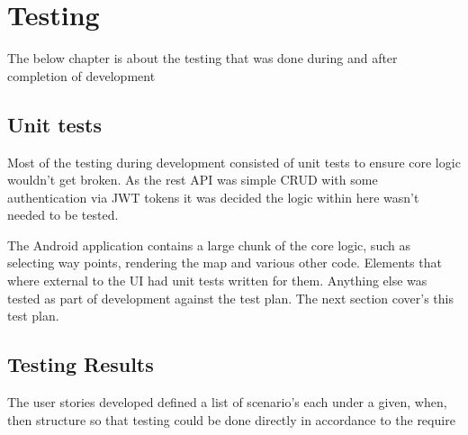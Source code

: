 \section{Testing}
The below chapter is about the testing that was done during and after completion of development

\subsection{Unit tests}
Most of the testing during development consisted of unit tests to ensure core logic wouldn't get broken. As the rest API was simple CRUD with some authentication via JWT tokens it was decided the logic within here wasn't needed to be tested. 

The Android application contains a large chunk of the core logic, such as selecting way points, rendering the map and various other code. Elements that where external to the UI had unit tests written for them. Anything else was tested as part of development against the test plan. The next section cover's this test plan.

\subsection{Testing Results}
The user stories developed defined a list of scenario's each under a given, when, then structure so that testing could be done directly in accordance to the require